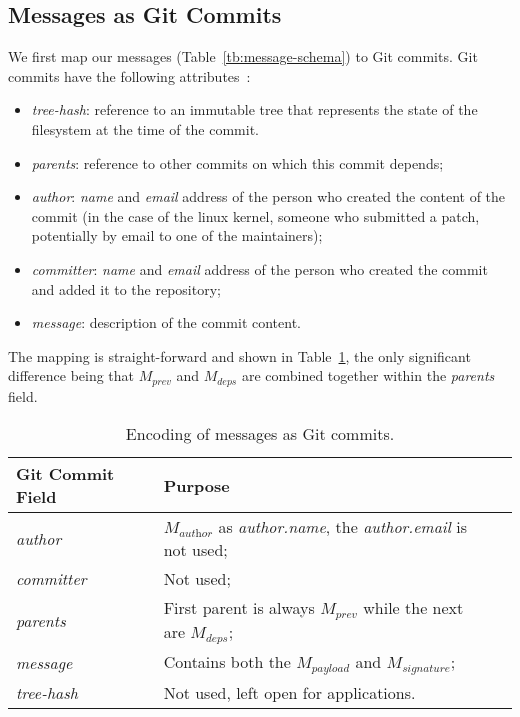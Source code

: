 \documentclass[9pt, oneside]{article}   	%
\begin{document}
\subsection{Messages as Git Commits}

We first map our messages (Table~\ref{tb:message-schema})  to Git commits. Git commits have the following attributes~\cite{git-commit}:
\begin{itemize}
	\item \textit{tree-hash}: reference to an immutable tree that represents the state of the filesystem at the time of the commit. 
	\item \textit{parents}: reference to other commits on which this commit depends;
	\item \textit{author}: \textit{name} and \textit{email} address of the person who created the content of the commit (in the case of the linux kernel, someone who submitted a patch, potentially by email to one of the maintainers);
	\item \textit{committer}: \textit{name} and \textit{email} address of the person who created the commit and added it to the repository;
	\item \textit{message}: description of the commit content.
\end{itemize}

The mapping is straight-forward and shown in Table~\ref{tb:git-commits}, the only significant difference being that $M_\textit{prev}$ and $M_\textit{deps}$ are combined together within the \textit{parents} field.

\begin{table}[ht]
\centering
\caption{Encoding of messages as Git commits.}
\label{tb:git-commits}
\begin{centering}
\begin{tabular}{lll}
\textbf{Git Commit Field}         & \textbf{Purpose} \\ \hline
\textit{author} 		      	      &  $M_\textit{author}$ as \textit{author.name}, the \textit{author.email} is not used;      \\
\textit{committer}                     & Not used;           \\
\textit{parents}    	   	      & First parent is always $M_\textit{prev}$ while the next are $M_\textit{deps}$;           \\
\textit{message}  	  	      &  Contains both the $M_\textit{payload}$ and $M_\textit{signature}$; \\
\textit{tree-hash}  		      & Not used, left open for applications.                             
\end{tabular}
\newline
\end{centering}
\end{table}
\end{document}
